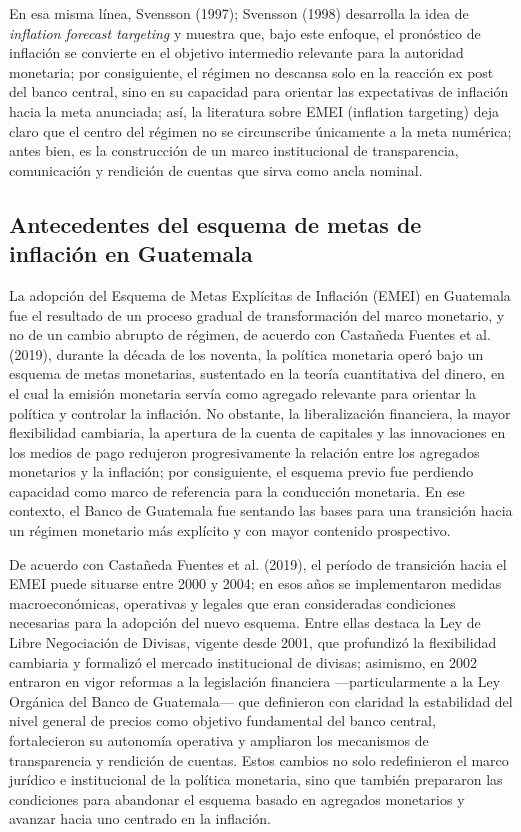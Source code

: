 \documentclass[
  10.5pt,
  letterpaper,
  twocolumn]{article}
\begin{document}
En esa misma línea, Svensson (1997); Svensson (1998) desarrolla la idea
de \emph{inflation forecast targeting} y muestra que, bajo este enfoque,
el pronóstico de inflación se convierte en el objetivo intermedio
relevante para la autoridad monetaria; por consiguiente, el régimen no
descansa solo en la reacción ex post del banco central, sino en su
capacidad para orientar las expectativas de inflación hacia la meta
anunciada; así, la literatura sobre EMEI (inflation targeting) deja
claro que el centro del régimen no se circunscribe únicamente a la meta
numérica; antes bien, es la construcción de un marco institucional de
transparencia, comunicación y rendición de cuentas que sirva como ancla
nominal.

\subsection{Antecedentes del esquema de metas de inflación en
Guatemala}\label{antecedentes-del-esquema-de-metas-de-inflaciuxf3n-en-guatemala}

La adopción del Esquema de Metas Explícitas de Inflación (EMEI) en
Guatemala fue el resultado de un proceso gradual de transformación del
marco monetario, y no de un cambio abrupto de régimen, de acuerdo con
Castañeda Fuentes et al. (2019), durante la década de los noventa, la
política monetaria operó bajo un esquema de metas monetarias, sustentado
en la teoría cuantitativa del dinero, en el cual la emisión monetaria
servía como agregado relevante para orientar la política y controlar la
inflación. No obstante, la liberalización financiera, la mayor
flexibilidad cambiaria, la apertura de la cuenta de capitales y las
innovaciones en los medios de pago redujeron progresivamente la relación
entre los agregados monetarios y la inflación; por consiguiente, el
esquema previo fue perdiendo capacidad como marco de referencia para la
conducción monetaria. En ese contexto, el Banco de Guatemala fue
sentando las bases para una transición hacia un régimen monetario más
explícito y con mayor contenido prospectivo.

De acuerdo con Castañeda Fuentes et al. (2019), el período de transición
hacia el EMEI puede situarse entre 2000 y 2004; en esos años se
implementaron medidas macroeconómicas, operativas y legales que eran
consideradas condiciones necesarias para la adopción del nuevo esquema.
Entre ellas destaca la Ley de Libre Negociación de Divisas, vigente
desde 2001, que profundizó la flexibilidad cambiaria y formalizó el
mercado institucional de divisas; asimismo, en 2002 entraron en vigor
reformas a la legislación financiera ---particularmente a la Ley
Orgánica del Banco de Guatemala--- que definieron con claridad la
estabilidad del nivel general de precios como objetivo fundamental del
banco central, fortalecieron su autonomía operativa y ampliaron los
mecanismos de transparencia y rendición de cuentas. Estos cambios no
solo redefinieron el marco jurídico e institucional de la política
monetaria, sino que también prepararon las condiciones para abandonar el
esquema basado en agregados monetarios y avanzar hacia uno centrado en
la inflación.
\end{document}
